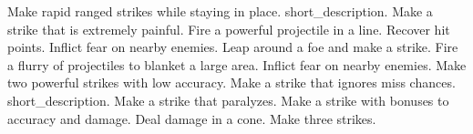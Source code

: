 \begin{spelllist}
 Make rapid ranged strikes while staying in place.
 short_description.
 Make a strike that is extremely painful.
 Fire a powerful projectile in a line.
 Recover hit points.
 Inflict fear on nearby enemies.
 Leap around a foe and make a strike.
 Fire a flurry of projectiles to blanket a large area.
 Inflict fear on nearby enemies.
 Make two powerful strikes with low accuracy.
 Make a strike that ignores miss chances.
 short_description.
 Make a strike that paralyzes.
 Make a strike with bonuses to accuracy and damage.
 Deal damage in a cone.
 Make three strikes.
\end{spelllist}
